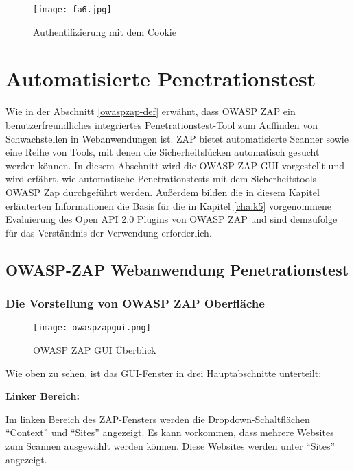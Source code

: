 \begin{figure}[h]
	\centering
	\texttt{[image: fa6.jpg]}
	\caption{Authentifizierung mit dem Cookie}
\end{figure}

\section{Automatisierte Penetrationstest}

Wie in der Abschnitt \ref{owaspzap-def} erwähnt, dass OWASP ZAP ein benutzerfreundliches integriertes Penetrationstest-Tool zum Auffinden von Schwachstellen in Webanwendungen ist. ZAP bietet automatisierte Scanner sowie eine Reihe von Tools, mit denen die Sicherheitslücken automatisch gesucht werden können. In diesem Abschnitt wird die OWASP ZAP-GUI vorgestellt und wird erfährt, wie automatische Penetrationstests mit dem Sicherheitstools OWASP Zap durchgeführt werden. Außerdem bilden die in diesem Kapitel erläuterten Informationen die Basis für die in Kapitel \ref{cha:k5} vorgenommene Evaluierung des Open API 2.0 Plugins von OWASP ZAP und sind demzufolge für das Verständnis der Verwendung erforderlich.

\subsection{OWASP-ZAP Webanwendung Penetrationstest}

\subsubsection{Die Vorstellung von OWASP ZAP Oberfläche}

\begin{figure}[h]
	\centering
	\texttt{[image: owaspzapgui.png]}
	\caption{OWASP ZAP GUI Überblick}
\end{figure}

Wie oben zu sehen, ist das GUI-Fenster in drei Hauptabschnitte unterteilt:\\

\begin{flushleft}
	\textbf{Linker Bereich:}\\
\end{flushleft}
Im linken Bereich des ZAP-Fensters werden die Dropdown-Schaltflächen "`Context"' und "`Sites"' angezeigt. Es kann vorkommen, dass mehrere Websites zum Scannen ausgewählt werden können. Diese Websites werden unter "`Sites"' angezeigt.

